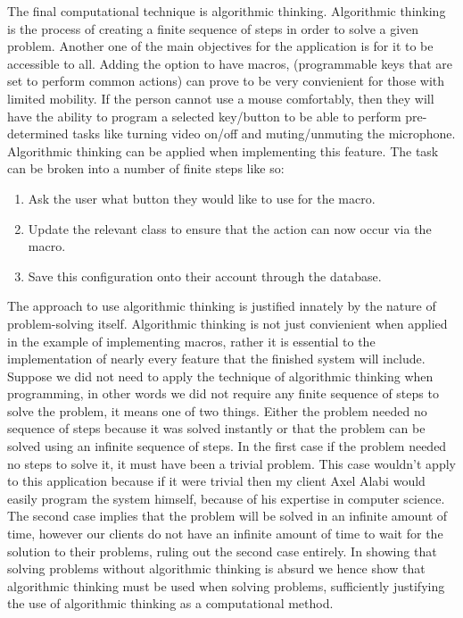 The final computational technique is algorithmic thinking. 
Algorithmic thinking is the process of creating a finite 
sequence of steps in order to solve a given problem. Another 
one of the main objectives for the application is for it to be
accessible to all. Adding the option to have macros, 
(programmable keys that are set to perform common actions) 
can prove to be very convienient for those with limited
mobility. If the person cannot use a mouse comfortably, then 
they will have the ability to program a selected key/button to 
be able to perform pre-determined tasks like turning video
on/off and muting/unmuting the microphone. Algorithmic thinking
can be applied when implementing this feature. The task can 
be broken into a number of finite steps like so: \\

\begin{enumerate}
  \item Ask the user what button they would like to use for the macro.
  \item Update the relevant class to ensure that the action can now occur via the macro.
  \item Save this configuration onto their account through the database.
\end{enumerate}

The approach to use algorithmic thinking is justified innately
by the nature of problem-solving itself. Algorithmic thinking
is not just convienient when applied in the example of
implementing
macros, rather it is essential to the implementation of nearly
every feature that the finished system will include. Suppose 
we did not need to apply the technique of algorithmic
thinking when programming, in other words we did not require
any finite sequence of steps to solve the problem, it means 
one of two things. Either the problem needed no sequence of 
steps because it was solved instantly or that the problem
can be solved
using an infinite sequence of steps. In the first case if the
problem needed no steps to solve it, it must have been a
trivial problem. This case wouldn't apply to this application
because if it were trivial then my client Axel Alabi would 
easily program the system himself, because of his expertise in 
computer science. The second case implies that the problem will
be solved in an infinite amount of time, however our clients
do not have an infinite amount of time to wait for the 
solution to their problems, ruling out the second case 
entirely. In showing that solving problems without algorithmic
thinking is absurd we hence show that algorithmic thinking
must be used when solving problems, sufficiently justifying 
the use of algorithmic thinking as a computational method.\\
\vspace{0.2cm}

